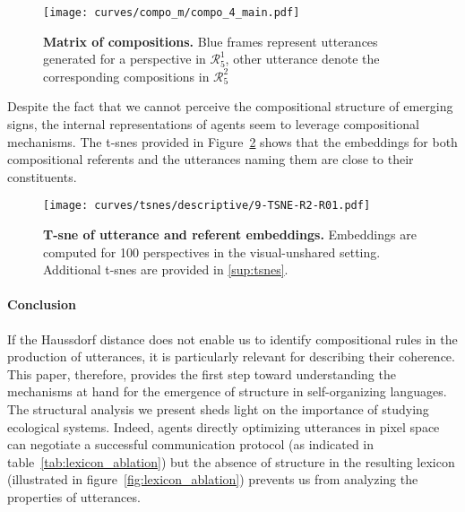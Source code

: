 \begin{figure}[!h]
\centering
\texttt{[image: curves/compo\_m/compo\_4\_main.pdf]}
\caption{\textbf{Matrix of compositions. }Blue frames represent utterances generated for a perspective in $\mathcal{R}_5^1$, other utterance denote the corresponding compositions in $\mathcal{R}_5^2$ }
\label{fig:compo_matrix}
\end{figure}

Despite the fact that we cannot perceive the compositional structure of emerging signs, the internal representations of agents seem to leverage compositional mechanisms. The t-snes provided in Figure~\ref{fig:tsne} shows that the embeddings for both compositional referents and the utterances naming them are close to their constituents. 
\begin{figure}[!h]
    \centering
    \texttt{[image: curves/tsnes/descriptive/9-TSNE-R2-R01.pdf]}
    \caption{\textbf{T-sne of utterance and referent embeddings.} Embeddings are computed for 100 perspectives in the visual-unshared setting. Additional t-snes are provided in \ap\ref{sup:tsnes}.}
    \label{fig:tsne}
\end{figure}

\paragraph{Conclusion} If the Haussdorf distance does not enable us to identify compositional rules in the production of utterances, it is particularly relevant for describing their coherence. This paper, therefore, provides the first step toward understanding the mechanisms at hand for the emergence of structure in self-organizing languages. The structural analysis we present sheds light on the importance of studying ecological systems. 
Indeed, agents directly optimizing utterances in pixel space can negotiate a successful communication protocol (as indicated in table~\ref{tab:lexicon_ablation}) but the absence of structure in the resulting lexicon (illustrated in figure~\ref{fig:lexicon_ablation}) prevents us from analyzing the properties of utterances. 

